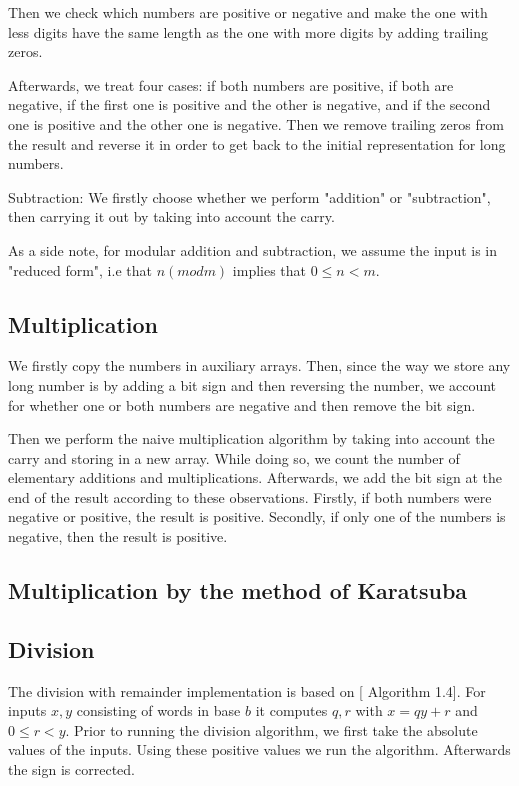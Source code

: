 \documentclass[a4paper]{article}
\begin{document}
Then we check which numbers are positive or negative and make the  one with less digits have the same length as the one with more digits by adding trailing zeros. 

Afterwards, we treat four cases: if both numbers are positive, if both are negative, if the first one is positive and the other is negative, and if the second one is positive and the other one is negative. Then we remove trailing zeros from the result and reverse it in order to get back to the initial representation for long numbers.

Subtraction: We firstly choose whether we perform "addition"  or "subtraction", then carrying it out by taking into account the carry. 

As a side note, for modular addition and subtraction, we assume the input is in "reduced form", i.e that $n (mod m)$ implies that $0 \leq n < m.$


\subsection{Multiplication}

We firstly copy the numbers in auxiliary arrays. Then, since the way we store any long number is by adding a bit sign and then reversing the number, we account for whether one or both numbers are negative and then remove the bit sign. 

Then we perform the naive multiplication algorithm \cite{shoup} by taking into account the carry and storing in a new array. While doing so, we count the number of elementary additions and multiplications. Afterwards, we add the bit sign at the end of the result according to these observations. Firstly, if both numbers were negative or positive, the result is positive. Secondly, if only one of the numbers is negative, then the result is positive. 

\subsection{Multiplication by the method of Karatsuba}

\subsection{Division}

The division with remainder implementation is based on [\cite{ant} Algorithm 1.4].
For inputs $x, y$ consisting of words in base $b$ it computes $q, r$ with $x=qy+r$ and $0 \le r < y$.
Prior to running the division algorithm, we first take the absolute values of the inputs.
Using these positive values we run the algorithm.
Afterwards the sign is corrected.
\end{document}
